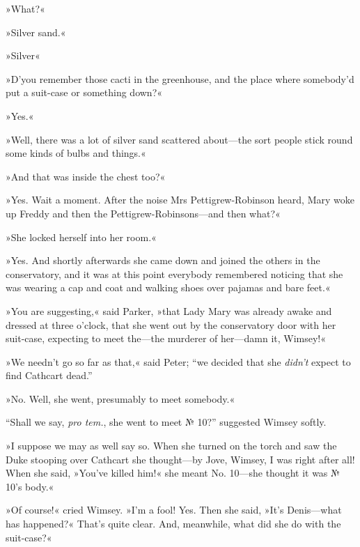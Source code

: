»What?«

»Silver sand.«

»Silver\longdash«

»D'you remember those cacti in the greenhouse, and the place where somebody'd put a suit-case or something down?«

»Yes.«

»Well, there was a lot of silver sand scattered about\allowbreak---\allowbreak the sort people stick round some kinds of bulbs and things.«

»And that was inside the chest too?«

»Yes. Wait a moment. After the noise Mrs Pettigrew-Robinson heard, Mary woke up Freddy and then the Pettigrew-Robinsons\allowbreak---\allowbreak and then what?«

»She locked herself into her room.«

»Yes. And shortly afterwards she came down and joined the others in the conservatory, and it was at this point everybody remembered noticing that she was wearing a cap and coat and walking shoes over pajamas and bare feet.«

»You are suggesting,« said Parker, »that Lady Mary was already awake and dressed at three o'clock, that she went out by the conservatory door with her suit-case, expecting to meet the\allowbreak---\allowbreak the murderer of her\allowbreak---\allowbreak damn it, Wimsey!«

»We needn't go so far as that,« said Peter; \enquote{we decided that she \textit{didn't} expect to find Cathcart dead.}

»No. Well, she went, presumably to meet somebody.«

\enquote{Shall we say, \textit{pro tem.}, she went to meet № 10?} suggested Wimsey softly.

»I suppose we may as well say so. When she turned on the torch and saw the Duke stooping over Cathcart she thought\allowbreak---\allowbreak by Jove, Wimsey, I was right after all! When she said, »You've killed him!« she meant No.  10\allowbreak---\allowbreak she thought it was № 10's body.«

»Of course!« cried Wimsey. »I'm a fool! Yes. Then she said, »It's Denis\allowbreak---\allowbreak what has happened?« That's quite clear. And, meanwhile, what did she do with the suit-case?«

